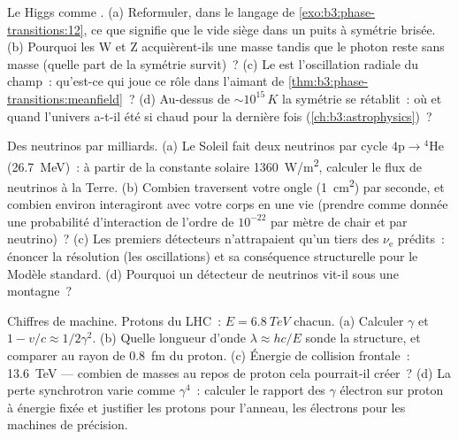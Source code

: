 \begin{exercise}[$\star\star\star$]\label{exo:b3:particle-physics:9}
Le Higgs comme . (a) Reformuler, dans le langage
de \cref{exo:b3:phase-transitions:12}, ce que signifie que le vide
siège dans un puits à symétrie brisée. (b) Pourquoi les W et Z
acquièrent-ils une masse tandis que le photon reste sans masse
(quelle part de la symétrie survit)~? (c) Le  est
l'oscillation radiale du champ~: qu'est-ce qui joue ce rôle dans
l'aimant de \cref{thm:b3:phase-transitions:meanfield}~? (d) Au-dessus
de $\sim10^{15}\,\unit{K}$ la symétrie se rétablit~: où et quand
l'univers a-t-il été si chaud pour la dernière fois
(\cref{ch:b3:astrophysics})~?
\end{exercise}

\begin{exercise}[$\star\star\star$]\label{exo:b3:particle-physics:10}
Des neutrinos par milliards. (a) Le Soleil fait deux neutrinos par
cycle $4\text{p} \to {}^4\text{He}$ (\qty{26.7}{MeV})~: à partir de
la constante solaire \qty{1360}{W/m^2}, calculer le flux de neutrinos
à la Terre. (b) Combien traversent votre ongle
(\qty{1}{cm^2}) par seconde, et combien environ interagiront avec
votre corps en une vie (prendre comme donnée une probabilité
d'interaction de l'ordre de $10^{-22}$ par mètre de chair et par
neutrino)~? (c) Les premiers
détecteurs n'attrapaient qu'un tiers des $\nu_{\text{e}}$ prédits~:
énoncer la résolution (les oscillations) et sa conséquence
structurelle pour le Modèle standard. (d) Pourquoi un détecteur de
neutrinos vit-il sous une montagne~?
\end{exercise}

\begin{exercise}[$\star\star\star$]\label{exo:b3:particle-physics:11}
Chiffres de machine. Protons du LHC~: $E = \qty{6.8}{TeV}$ chacun.
(a) Calculer $\gamma$ et $1 - v/c \approx 1/2\gamma^2$. (b) Quelle
longueur d'onde $\lambda \approx hc/E$ sonde la structure, et
comparer au rayon de \qty{0.8}{fm} du proton. (c) Énergie de
collision frontale~: \qty{13.6}{TeV} --- combien de masses au repos
de proton cela pourrait-il créer~? (d) La perte synchrotron varie
comme $\gamma^4$~: calculer le rapport des $\gamma$ électron sur
proton à énergie fixée et justifier les protons pour l'anneau, les
électrons pour les machines de précision.
\end{exercise}

